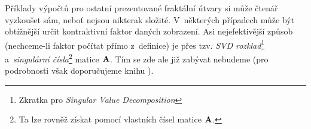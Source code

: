 Příklady výpočtů pro ostatní prezentované fraktální útvary si může čtenář vyzkoušet sám, neboť nejsou nikterak složité. V~některých případech může být obtížnější určit kontraktivní faktor daných zobrazení. Asi nejefektivější způsob (nechceme-li faktor počítat přímo z~definice) je přes tzv. \emph{SVD rozklad}\footnote{Zkratka pro \emph{Singular Value Decomposition}} a~\emph{singulární čísla}\footnote{Ta lze rovněž získat pomocí vlastních čísel matice $\mathbf{A}$.} matice $\mathbf{A}$. Tím se zde ale již zabývat nebudeme (pro podrobnosti však doporučujeme knihu \cite{Hladik2019}).
